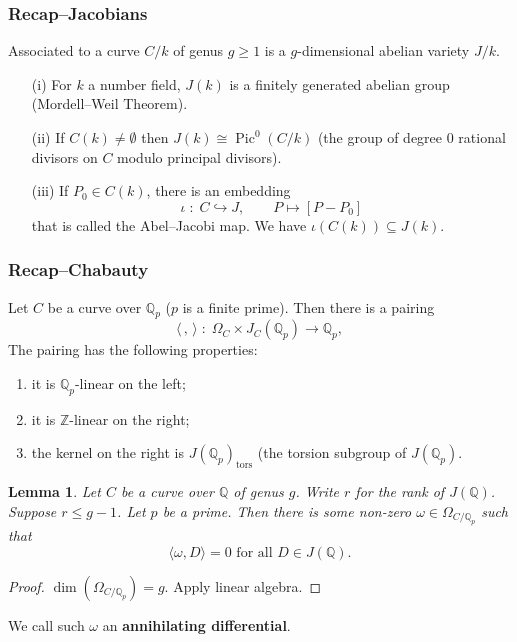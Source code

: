 \documentclass{beamer}
\DeclareMathOperator{\Pic}{Pic}
\newcommand{\Q}{{\mathbb Q}}
\newcommand{\Z}{{\mathbb Z}}
\newtheorem{lem}{Lemma}
\theoremstyle{definition}
\theoremstyle{remark}
\begin{document}
\begin{frame}
\frametitle{Recap--Jacobians}
Associated to a curve $C/k$ of genus $g\ge 1$ is a $g$-dimensional
abelian variety $J/k$.
\begin{enumerate}
\item[(i)] For $k$ a number field, $J(k)$
is a finitely generated abelian group (Mordell--Weil Theorem).
\item[(ii)] If $C(k) \ne \emptyset$ then $J(k) \cong \Pic^0(C/k)$
(the group of degree $0$ rational divisors on $C$ modulo principal divisors).
\item[(iii)] If $P_0 \in C(k)$, there is an embedding
\[
\iota \; : \; C \hookrightarrow J, \qquad P \mapsto [P-P_0]
\]
that is called the Abel--Jacobi map. We have $\iota(C(k)) \subseteq J(k)$.
\end{enumerate}
\end{frame}
\begin{frame}
\frametitle{Recap--Chabauty}
Let $C$ be a curve over $\Q_p$ ($p$ is a finite prime). Then there
is a pairing
\[
\langle \, , \, \rangle \; : \;
\Omega_{C} \times J_C(\Q_p) \rightarrow \Q_p,
\]
The pairing has the following properties:
\begin{enumerate}
\item it is $\Q_p$-linear on the left;
\item it is $\Z$-linear on the right;
\item the kernel on the right is $J(\Q_p)_{\mathrm{tors}}$ (the 
torsion subgroup of $J(\Q_p)$.
\end{enumerate}

\begin{lem}
Let $C$ be a curve over $\Q$ of genus $g$. Write 
$r$ for the rank of $J(\Q)$. Suppose $r\le g-1$. Let $p$
be a prime. Then there is some non-zero $\omega \in \Omega_{C/\Q_p}$
such that
\[
\text{$\langle \omega , D\rangle=0$ for all $D \in J(\Q)$}.
\]
\end{lem}
\begin{proof}
$\dim(\Omega_{C/\Q_p})=g$. Apply linear algebra.
\end{proof}
We call such $\omega$ an \textbf{annihilating differential}.
\end{frame}
\end{document}
